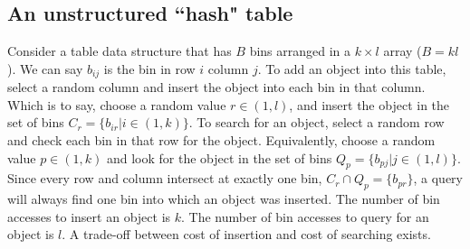 \documentclass[9.5pt,journal,final,finalsubmission,twocolumn]{IEEEtran}
\begin{document}
\subsection{An unstructured ``hash" table}
\label{sec:localtab}

Consider a table data structure that has $B$ bins arranged in a $k\times l$
array ($B=kl$).  We can say $b_{ij}$ is the bin in row $i$ column $j$.  To add an
object into this table, select a random column and insert the object into each
bin in that column.  Which is to say, choose a random value $r\in (1,l)$,
and insert the object in the set of bins $C_r = \{b_{ir} | i \in (1,k)\}$.
To search for an object, select a random row and check each bin in that
row for the
object.  Equivalently, choose a random value $p \in (1,k)$ and look
for the object in the set of bins $Q_p = \{b_{pj} | j \in (1,l)\}$.  Since
every row and column intersect at exactly one bin, $C_r \cap Q_p = \{b_{pr}\}$,
a query will always find
one bin into which an object was inserted.  The number of bin accesses to
insert an object is $k$.  The number of bin accesses to query for an object is
$l$.  A trade-off between cost of insertion and cost of searching exists.
\end{document}
